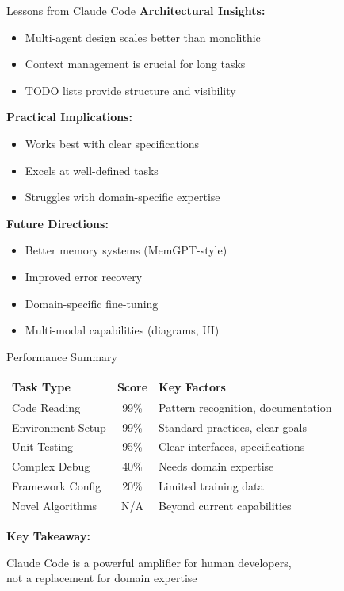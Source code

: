 \documentclass[aspectratio=169]{beamer}
\begin{document}
\begin{frame}{Lessons from Claude Code}
	\textbf{Architectural Insights:}
	\begin{itemize}
		\item {\color{highlight}Multi-agent} design scales better than monolithic
		\item {\color{highlight}Context management} is crucial for long tasks
		\item {\color{highlight}TODO lists} provide structure and visibility
	\end{itemize}
	
	\textbf{Practical Implications:}
	\begin{itemize}
		\item Works best with {\color{highlight}clear specifications}
		\item Excels at {\color{highlight}well-defined tasks}
		\item Struggles with {\color{highlight}domain-specific expertise}
	\end{itemize}
	
	\textbf{Future Directions:}
	\begin{itemize}
		\item Better memory systems (MemGPT-style)
		\item Improved error recovery
		\item Domain-specific fine-tuning
		\item Multi-modal capabilities (diagrams, UI)
	\end{itemize}
\end{frame}

\begin{frame}{Performance Summary}
	\begin{center}
		\begin{tabular}{|l|c|p{5cm}|}
			\hline
			\textbf{Task Type} & \textbf{Score} & \textbf{Key Factors} \\
			\hline
			Code Reading & {\color{green}99\%} & Pattern recognition, documentation \\
			Environment Setup & {\color{green}99\%} & Standard practices, clear goals \\
			Unit Testing & {\color{green}95\%} & Clear interfaces, specifications \\
			Complex Debug & {\color{orange}40\%} & Needs domain expertise \\
			Framework Config & {\color{red}20\%} & Limited training data \\
			Novel Algorithms & {\color{red}N/A} & Beyond current capabilities \\
			\hline
		\end{tabular}
	\end{center}
	
	\vspace{0.5cm}
	
	\textbf{Key Takeaway:}
	\begin{center}
		\large
		{\color{highlight}Claude Code is a powerful amplifier for human developers,}\\
		{\color{highlight}not a replacement for domain expertise}
	\end{center}
\end{frame}
\end{document}
